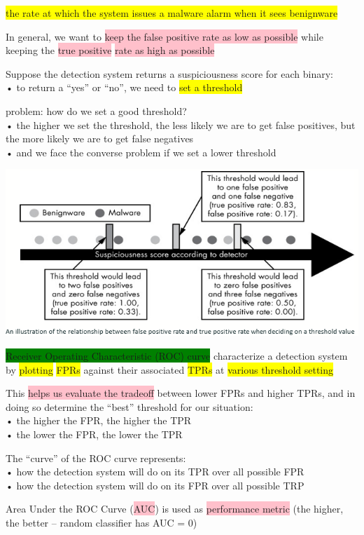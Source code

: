\documentclass[]{project_plan}
\begin{document}
\colorbox{yellow}{the rate at which the system issues a malware alarm when it sees benignware}

In general, we want to \colorbox{pink}{keep the false positive rate as low as possible} while keeping the \colorbox{pink}{true positive} \colorbox{pink}{rate as high as possible}

Suppose the detection system returns a suspiciousness score for each binary:\\
• to return a “yes” or “no”, we need to \colorbox{yellow}{set a threshold}

problem: how do we set a good threshold?\\
• the higher we set the threshold, the less likely we are to get false positives, but the more likely we are to get false negatives\\
• and we face the converse problem if we set a lower threshold

\includegraphics[width=.8\linewidth]{ml102.png}

\colorbox{green}{Receiver Operating Characteristic (ROC) curve} characterize a detection system by \colorbox{yellow}{plotting} \colorbox{yellow}{FPRs} against their associated \colorbox{yellow}{TPRs} at \colorbox{yellow}{various threshold setting}

This \colorbox{pink}{helps us evaluate the tradeoff} between lower FPRs and higher TPRs, and in doing so determine the “best” threshold for our situation:\\
• the higher the FPR, the higher the TPR\\
• the lower the FPR, the lower the TPR

The “curve” of the ROC curve represents:\\
• how the detection system will do on its TPR over all possible FPR\\
• how the detection system will do on its FPR over all possible TRP

Area Under the ROC Curve (\colorbox{pink}{AUC}) is used as \colorbox{pink}{performance metric} (the higher, the better – random classifier has AUC = 0)
\end{document}
